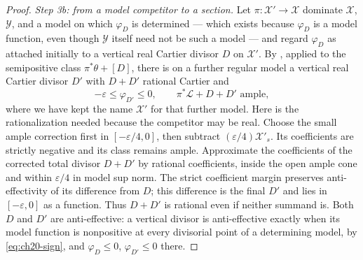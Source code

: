 \begin{proof}
\emph{Step 3b: from a model competitor to a section.}
Let $\pi:\mathcal X'\to\mathcal X$ dominate $\mathcal X$,
$\mathcal Y$, and a model on which $\varphi_D$ is determined --- which
exists because $\varphi_D$ is a model function, even though
$\mathcal Y$ itself need not be such a model --- and regard $\varphi_D$
as attached initially to a vertical real Cartier divisor $D$ on
$\mathcal X'$.  By
, applied to the semipositive class
$\pi^*\theta+[D]$, there is on a further regular model a vertical real Cartier divisor
$D'$ with $D+D'$ rational Cartier and
\begin{equation}\label{eq:ch23-small-ample-correction}
     -\varepsilon\leq\varphi_{D'}\leq0,
     \qquad
     \pi^*\mathcal L+D+D'\text{ ample},
\end{equation}
where we have kept the name $\mathcal X'$ for that further model.
Here is the rationalization needed because the competitor may be real.
Choose the small ample correction first in
$[-\varepsilon/4,0]$, then subtract
$(\varepsilon/4)\mathcal X'_s$.  Its coefficients are strictly
negative and its class remains ample.  Approximate the coefficients of
the corrected total divisor $D+D'$ by rational coefficients, inside
the open ample cone and within $\varepsilon/4$ in model sup norm.
The strict coefficient margin preserves anti-effectivity of its difference
from $D$; this difference is the final $D'$ and lies in
$[-\varepsilon,0]$ as a function.  Thus $D+D'$ is rational even if
neither summand is.  Both $D$ and $D'$ are anti-effective: a vertical divisor is anti-effective
exactly when its model function is nonpositive at every divisorial point of
a determining model, by \eqref{eq:ch20-sign}, and
$\varphi_D\leq0$, $\varphi_{D'}\leq0$ there.


\end{proof}
